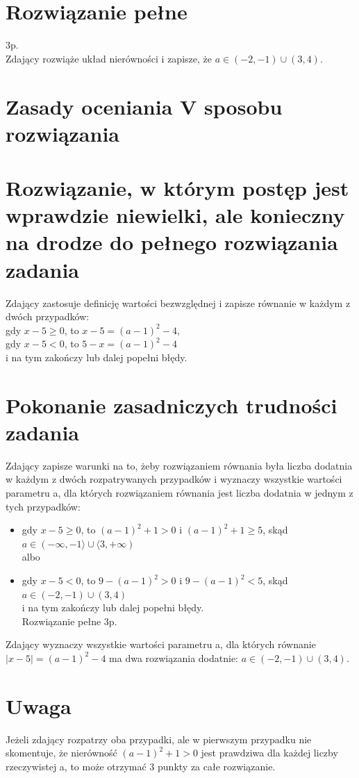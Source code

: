 \documentclass[10pt]{article}
\begin{document}
\section*{Rozwiązanie pełne}
3p.\\
Zdający rozwiąże układ nierówności i zapisze, że $a \in(-2,-1) \cup(3,4)$.

\section*{Zasady oceniania V sposobu rozwiązania}
\section*{Rozwiązanie, w którym postęp jest wprawdzie niewielki, ale konieczny na drodze do pełnego rozwiązania zadania}
Zdający zastosuje definicję wartości bezwzględnej i zapisze równanie w każdym z dwóch przypadków:\\
gdy $x-5 \geq 0$, to $x-5=(a-1)^{2}-4$,\\
gdy $x-5<0$, to $5-x=(a-1)^{2}-4$\\
i na tym zakończy lub dalej popełni błędy.

\section*{Pokonanie zasadniczych trudności zadania}
Zdający zapisze warunki na to, żeby rozwiązaniem równania była liczba dodatnia w każdym z dwóch rozpatrywanych przypadków i wyznaczy wszystkie wartości parametru a, dla których rozwiązaniem równania jest liczba dodatnia w jednym z tych przypadków:

\begin{itemize}
  \item gdy $x-5 \geq 0$, to $(a-1)^{2}+1>0$ i $(a-1)^{2}+1 \geq 5$, skąd $a \in(-\infty,-1\rangle \cup\langle 3,+\infty)$\\
albo
  \item gdy $x-5<0$, to $9-(a-1)^{2}>0$ i $9-(a-1)^{2}<5$, skąd $a \in(-2,-1) \cup(3,4)$\\
i na tym zakończy lub dalej popełni błędy.\\
Rozwiązanie pełne 3p.
\end{itemize}

Zdający wyznaczy wszystkie wartości parametru a, dla których równanie $|x-5|=(a-1)^{2}-4$ ma dwa rozwiązania dodatnie: $a \in(-2,-1) \cup(3,4)$.

\section*{Uwaga}
Jeżeli zdający rozpatrzy oba przypadki, ale w pierwszym przypadku nie skomentuje, że nierówność $(a-1)^{2}+1>0$ jest prawdziwa dla każdej liczby rzeczywistej a, to może otrzymać 3 punkty za całe rozwiązanie.
\end{document}
